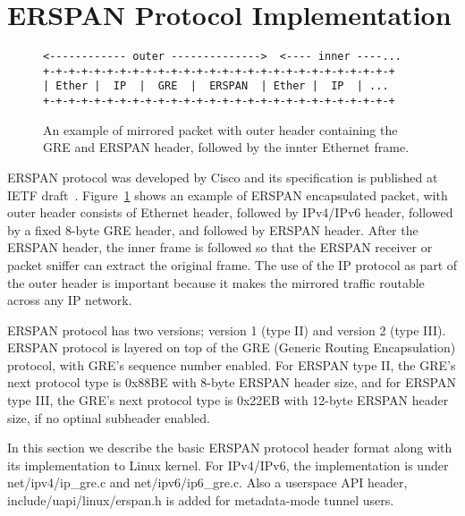 \documentclass{sigplanconf}
\begin{document}
\section{ERSPAN Protocol Implementation}
\begin{figure}
{\scriptsize
\begin{verbatim}
<------------ outer -------------->  <---- inner ----...
+-+-+-+-+-+-+-+-+-+-+-+-+-+-+-+-+-+-+-+-+-+-+-+-+-+-+-+
| Ether |  IP  |  GRE  |  ERSPAN  | Ether |  IP  | ...   
+-+-+-+-+-+-+-+-+-+-+-+-+-+-+-+-+-+-+-+-+-+-+-+-+-+-+-+
\end{verbatim}
}
\vspace{-1.0em}
\caption{An example of mirrored packet with outer header containing
the GRE and ERSPAN header, followed by the innter Ethernet frame.}
\label{erspanhdr}
\vspace{-1.0em}
\end{figure}

ERSPAN protocol was developed by Cisco and its specification is published at IETF
draft~\cite{erspan_ietf}. 
Figure~\ref{erspanhdr} shows an example of ERSPAN encapsulated
packet, with outer header consists of Ethernet header, followed by IPv4/IPv6
header, followed by a fixed 8-byte GRE header, and followed by ERSPAN header.
After the ERSPAN header, the inner frame is followed so that the ERSPAN receiver
or packet sniffer can extract the original frame.
The use of the IP protocol as part of the outer header is important because it
makes the mirrored traffic routable across any IP network.

ERSPAN protocol has two versions; version 1 (type II) and
version 2 (type III). ERSPAN protocol is layered on top of the GRE (Generic Routing
Encapsulation) protocol, with GRE's sequence number enabled.  For ERSPAN type II,
the GRE's next protocol type is 0x88BE with 8-byte ERSPAN header size, and for
ERSPAN type III, the GRE's next protocol type is 0x22EB with 12-byte ERSPAN header
size, if no optinal subheader enabled.

In this section we describe the basic ERSPAN protocol header format
along with its implementation to Linux kernel.
For IPv4/IPv6, the implementation is under net/ipv4/ip\_gre.c and
net/ipv6/ip6\_gre.c. Also a userspace API header, include/uapi/linux/erspan.h
is added for metadata-mode tunnel users.
\end{document}
